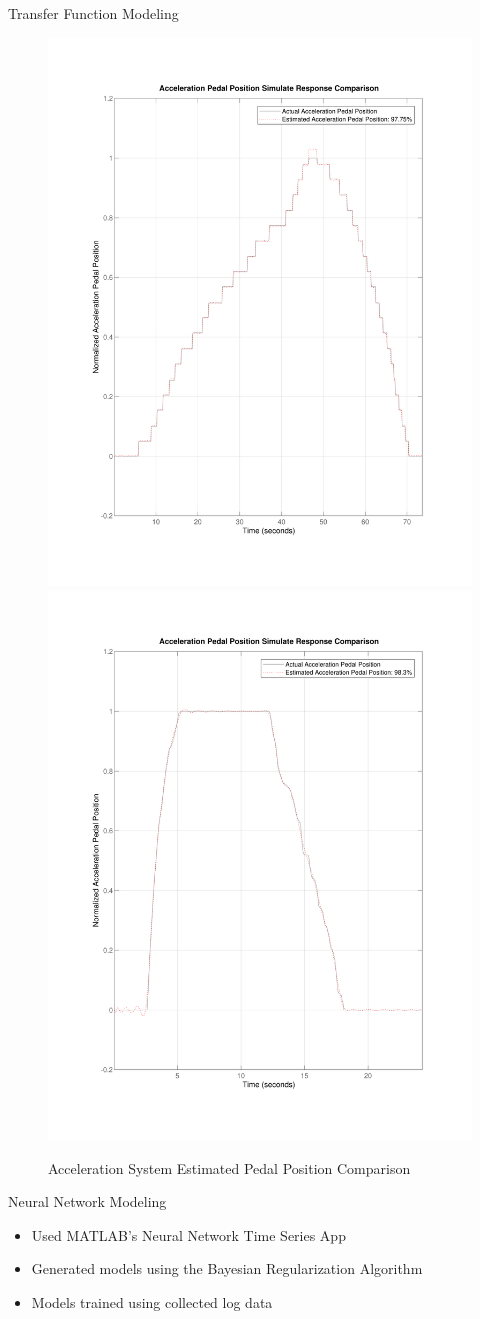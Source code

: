 \documentclass[final]{beamer}
\newlength{\onecolwid}
\begin{document}
\begin{frame}[t]
\begin{columns}[t]
\begin{column}{\onecolwid}
\begin{alertblock}{Transfer Function Modeling}
\begin{figure}
	\centering
	{\includegraphics[width=0.48\linewidth]{figs/img/byWireAccelArxModel}}
	{\includegraphics[width=0.48\linewidth]{figs/img/manualAccelTransferFunctionModel}}
	\caption{Acceleration System Estimated Pedal Position Comparison}
\end{figure}

\end{alertblock}


\begin{alertblock}{Neural Network Modeling}
\vskip 0.5cm
\begin{itemize}
    \item Used MATLAB's Neural Network Time Series App
    \item Generated models using the Bayesian Regularization Algorithm
    \item Models trained using collected log data  
\end{itemize} 


\end{alertblock}
\end{column}
\end{columns}
\end{frame}
\end{document}
